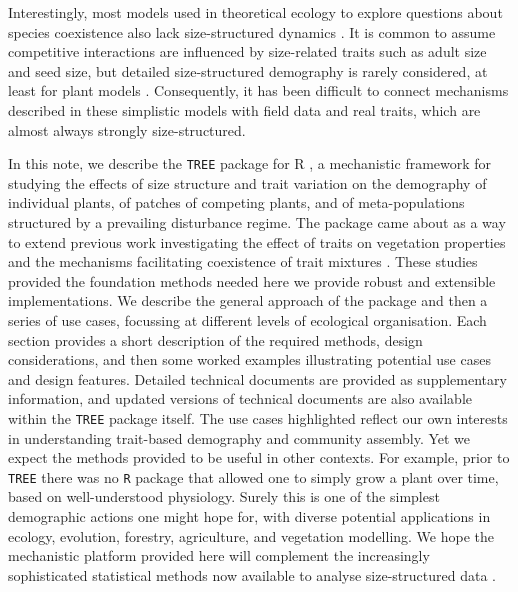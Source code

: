 \documentclass[a4paper,11pt]{article}
\begin{document}
Interestingly, most models used in theoretical ecology to explore
questions about species coexistence also lack size-structured dynamics
\citep[e.g.][]{Calcagno-2006, Geritz-1995, Leimar-2013, Levin-1974,MacArthur-1967,Tilman-1985}.
It is common to assume competitive interactions are influenced by
size-related traits such as adult size and seed size, but detailed
size-structured demography is rarely considered, at least for plant
models \cite[for animal examples, see][]{Deroos-1988, Deroos-1992}. Consequently, it has
been difficult to connect mechanisms described in these simplistic
models with field data and real traits, which are almost always strongly
size-structured.

In this note, we describe the \texttt{TREE} package for R
\citep{R-2015}, a mechanistic framework for studying the effects of size
structure and trait variation on the demography of individual plants, of
patches of competing plants, and of meta-populations structured by a
prevailing disturbance regime. The package came about as a way to extend
previous work investigating the effect of traits on vegetation
properties \citep{Falster-2011} and the mechanisms facilitating
coexistence of trait mixtures \citep{Falster-2015}. These studies
provided the foundation methods needed  here we provide robust and
extensible implementations. We describe the general approach of the
package and then a series of use cases, focussing at different levels of
ecological organisation. Each section provides a short description of
the required methods, design considerations, and then some worked
examples illustrating potential use cases and design features. Detailed
technical documents are provided as supplementary information, and updated
versions of technical documents are also available within the \texttt{TREE}
package itself. The use cases highlighted reflect our own interests in
understanding trait-based demography and community assembly. Yet we
expect the methods provided to be useful in other contexts. For example,
prior to \texttt{TREE} there was no \texttt{R} package that allowed one to simply grow a
plant over time, based on well-understood physiology. Surely this is one
of the simplest demographic actions one might hope for, with diverse
potential applications in ecology, evolution, forestry, agriculture, and
vegetation modelling. We hope the mechanistic platform provided here
will complement the increasingly sophisticated statistical methods now
available to analyse size-structured data \citep[e.g.][]{Metcalf-2013}.
\end{document}

